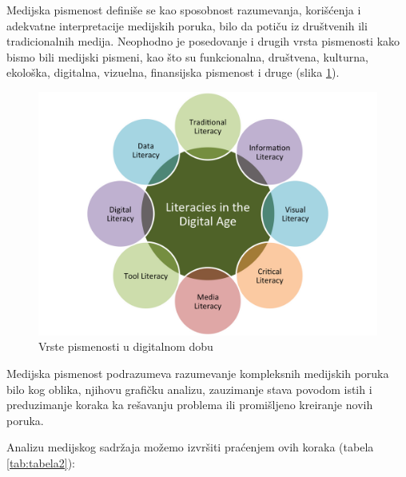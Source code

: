 \documentclass[a4paper]{article}
\begin{document}
Medijska pismenost definiše se kao sposobnost razumevanja, korišćenja i adekvatne interpretacije medijskih poruka, bilo da potiču iz društvenih ili tradicionalnih medija. Neophodno je posedovanje i drugih vrsta pismenosti kako bismo bili medijski pismeni, kao što su funkcionalna, društvena, kulturna, ekološka, digitalna, vizuelna, finansijska pismenost i druge \cite{literacy} (slika \ref{fig:literacies}).  

\begin{figure}[h!]
\begin{center}
\includegraphics[scale=0.35]{literacies.png}
\end{center}
\caption{Vrste pismenosti u digitalnom dobu}
\label{fig:literacies}
\end{figure}

Medijska pismenost podrazumeva razumevanje kompleksnih medijskih poruka bilo kog oblika, njihovu grafičku analizu, zauzimanje stava povodom istih i preduzimanje koraka ka rešavanju problema ili promišljeno kreiranje novih poruka.

Analizu medijskog sadržaja možemo izvršiti praćenjem ovih koraka \cite{tab2} (tabela \ref{tab:tabela2}):
\end{document}
